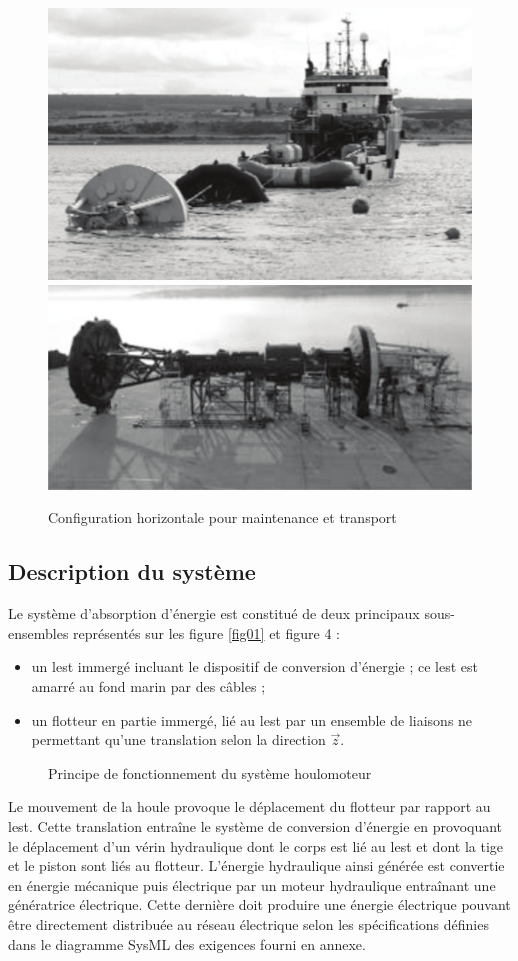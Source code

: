 \begin{figure}[ht!]
  \begin{center}
    \includegraphics[width=0.32\linewidth]{img/fig03a}
    \includegraphics[width=0.32\linewidth]{img/fig03b}
  \end{center}
  \caption{Configuration horizontale pour maintenance et transport}
\label{fig03}
\end{figure}

\vspace{-1cm}

\subsection{Description du système}

Le système d'absorption d'énergie est constitué de deux principaux sous-ensembles représentés sur les figure \ref{fig01} et figure 4 :
\begin{itemize}
 \item un lest immergé incluant le dispositif de conversion d'énergie ; ce lest est amarré au fond marin par des câbles ;
 \item un flotteur en partie immergé, lié au lest par un ensemble de liaisons ne permettant qu'une translation selon la direction $\vec{z}$.
\end{itemize}

\begin{figure}[ht!]
\begin{center}
  \def\svgwidth{0.7\linewidth}
  
 \end{center}
  \caption{Principe de fonctionnement du système houlomoteur}
\label{fig04}
\end{figure}

Le mouvement de la houle provoque le déplacement du flotteur par rapport au lest. Cette translation entraîne le système de conversion d'énergie en provoquant le déplacement d'un vérin hydraulique dont le corps est lié au lest et dont la tige et le piston sont liés au flotteur. L'énergie hydraulique
ainsi générée est convertie en énergie mécanique puis électrique par un moteur hydraulique entraînant une génératrice électrique. Cette dernière doit produire une énergie électrique pouvant être directement distribuée au réseau électrique selon les spécifications définies dans le diagramme SysML des exigences fourni en annexe.

